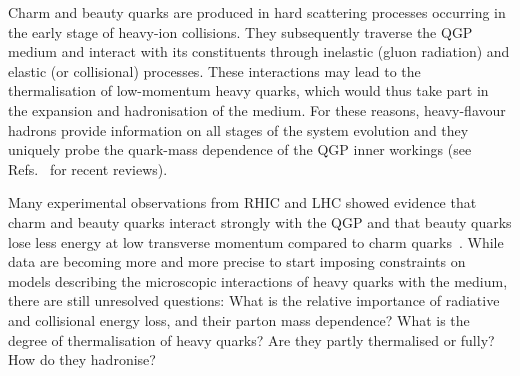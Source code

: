 Charm and beauty quarks are produced in hard scattering processes occurring in the early stage of heavy-ion collisions. They subsequently traverse the QGP medium and interact with its constituents through inelastic (gluon radiation) and elastic (or collisional) processes.
These interactions may lead to the thermalisation of low-momentum heavy quarks, which would thus take part in the expansion and hadronisation of the medium.
For these reasons, heavy-flavour hadrons provide information on all stages of the system evolution and they uniquely probe the quark-mass dependence of the QGP inner workings (see Refs.~\cite{Andronic:2015wma,Prino:2016cni,Rapp:2018qla} for recent reviews).

Many experimental observations from RHIC and LHC showed evidence that charm and beauty quarks interact strongly with the QGP and that beauty quarks lose less energy at low transverse momentum compared to charm quarks~\cite{Adam:2015nna,Khachatryan:2016ypw}. 
While data are becoming more and more precise to start imposing constraints on models describing the microscopic interactions of heavy quarks with the medium, there are still unresolved questions:  What is the relative importance of radiative and collisional energy loss, and their parton mass dependence? What is the degree of thermalisation of heavy quarks? Are they partly thermalised or fully? How do they hadronise? 

